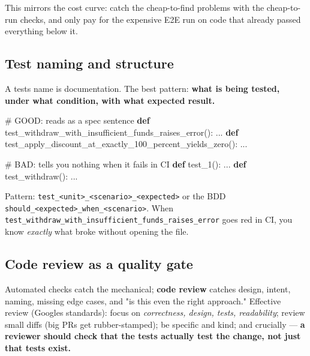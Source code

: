 \documentclass[11pt]{article}
\newenvironment{Shaded}{\begin{snugshade}}{\end{snugshade}}
\newcommand{\CommentTok}[1]{\textcolor[rgb]{0.48,0.49,0.49}{#1}}
\newcommand{\KeywordTok}[1]{\textcolor[rgb]{0.81,0.81,0.76}{\textbf{#1}}}
\newcommand{\NormalTok}[1]{\textcolor[rgb]{0.81,0.81,0.76}{#1}}
\begin{document}
This mirrors the cost curve: catch the cheap-to-find problems with the cheap-to-run checks, and only pay for the expensive E2E run on code that already passed everything below it.

\subsection{Test naming and structure}\label{test-naming-and-structure}

A test\textquotesingle s name is documentation. The best pattern: \textbf{what is being tested, under what condition, with what expected result.}


\begin{Shaded}
\begin{Highlighting}[]
\CommentTok{\# GOOD: reads as a spec sentence}
\KeywordTok{def}\NormalTok{ test\_withdraw\_with\_insufficient\_funds\_raises\_error(): ...}
\KeywordTok{def}\NormalTok{ test\_apply\_discount\_at\_exactly\_100\_percent\_yields\_zero(): ...}

\CommentTok{\# BAD: tells you nothing when it fails in CI}
\KeywordTok{def}\NormalTok{ test\_1(): ...}
\KeywordTok{def}\NormalTok{ test\_withdraw(): ...}
\end{Highlighting}
\end{Shaded}

Pattern: \texttt{test\_\textless{}unit\textgreater{}\_\textless{}scenario\textgreater{}\_\textless{}expected\textgreater{}} or the BDD \texttt{should\_\textless{}expected\textgreater{}\_when\_\textless{}scenario\textgreater{}}. When \texttt{test\_withdraw\_with\_insufficient\_funds\_raises\_error} goes red in CI, you know \emph{exactly} what broke without opening the file.

\subsection{Code review as a quality gate}\label{code-review-as-a-quality-gate}

Automated checks catch the mechanical; \textbf{code review} catches design, intent, naming, missing edge cases, and "is this even the right approach." Effective review (Google\textquotesingle s standards): focus on \emph{correctness, design, tests, readability}; review small diffs (big PRs get rubber-stamped); be specific and kind; and crucially --- \textbf{a reviewer should check that the tests actually test the change, not just that tests exist.}
\end{document}
